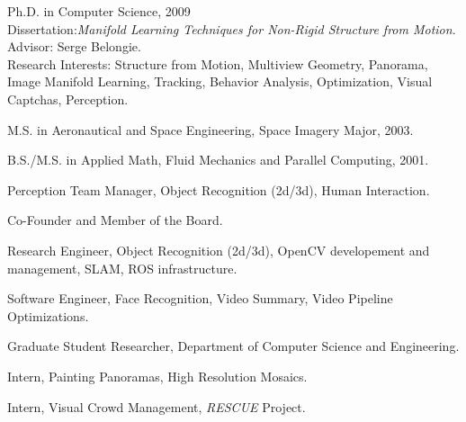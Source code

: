 


\begin{llist}

 
Ph.D. in Computer Science, 2009\\
Dissertation:\textit{Manifold Learning Techniques for Non-Rigid Structure from
Motion}.\\
Advisor: Serge Belongie.\\
Research Interests: Structure from Motion, Multiview Geometry, Panorama, Image Manifold Learning, Tracking, Behavior Analysis, Optimization, Visual Captchas, Perception.

 
M.S. in Aeronautical and Space Engineering, Space Imagery Major, 2003.

 
B.S./M.S. in Applied Math, Fluid Mechanics and Parallel Computing, 2001.

Perception Team Manager, Object Recognition (2d/3d), Human Interaction.

Co-Founder and Member of the Board.

Research Engineer, Object Recognition (2d/3d), OpenCV developement and management, SLAM, ROS infrastructure.

Software Engineer, Face Recognition, Video Summary, Video Pipeline
Optimizations.

Graduate Student Researcher, Department of Computer Science and Engineering.

Intern, Painting Panoramas, High Resolution Mosaics.

Intern, Visual Crowd Management, {\em RESCUE} Project.


\end{llist}

